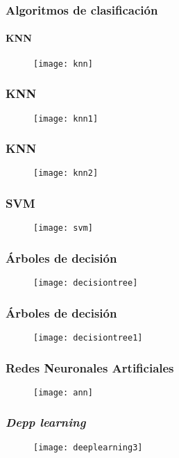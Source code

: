 \documentclass[14pt]{beamer}
\begin{document}
\begin{frame}
\frametitle{Algoritmos de clasificación}
\framesubtitle{KNN}
  \begin{figure}
    \centering
    \texttt{[image: knn]}
   \end{figure}
\end{frame}
\begin{frame}
\frametitle{KNN}
  \begin{figure}
    \centering
    \texttt{[image: knn1]}
   \end{figure}
\end{frame}
\begin{frame}
\frametitle{KNN}
  \begin{figure}
    \centering
    \texttt{[image: knn2]}
   \end{figure}
\end{frame}
\begin{frame}
\frametitle{SVM}
  \begin{figure}
    \centering
    \texttt{[image: svm]}
   \end{figure}
\end{frame}
\begin{frame}
\frametitle{Árboles de decisión}
  \begin{figure}
    \centering
    \texttt{[image: decisiontree]}
   \end{figure}
\end{frame}
\begin{frame}
\frametitle{Árboles de decisión}
  \begin{figure}
    \centering
    \texttt{[image: decisiontree1]}
   \end{figure}
\end{frame}
\begin{frame}
\frametitle{Redes Neuronales Artificiales}
  \begin{figure}
    \centering
    \texttt{[image: ann]}
   \end{figure}
\end{frame}
\begin{frame}
\frametitle{\emph{Depp learning}}
  \begin{figure}
    \centering
    \texttt{[image: deeplearning3]}
   \end{figure}
\end{frame}
\end{document}
